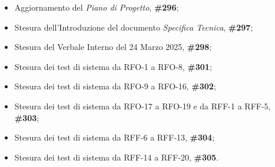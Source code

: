 \begin{itemize}
        \item Aggiornamento del \textit{Piano di Progetto},  \textbf{\#296};
        \item Stesura dell'Introduzione del documento \textit{Specifica Tecnica},  \textbf{\#297};
        \item Stesura del Verbale Interno del 24 Marzo 2025,  \textbf{\#298};
        \item Stesura dei test di sistema da RFO-1 a RFO-8,  \textbf{\#301};
        \item Stesura dei test di sistema da RFO-9 a RFO-16,  \textbf{\#302};
        \item Stesura dei test di sistema da RFO-17 a RFO-19 e da RFF-1 a RFF-5,  \textbf{\#303};
        \item Stesura dei test di sistema da RFF-6 a RFF-13,  \textbf{\#304};
        \item Stesura dei test di sistema da RFF-14 a RFF-20,  \textbf{\#305}. 
\end{itemize}



        